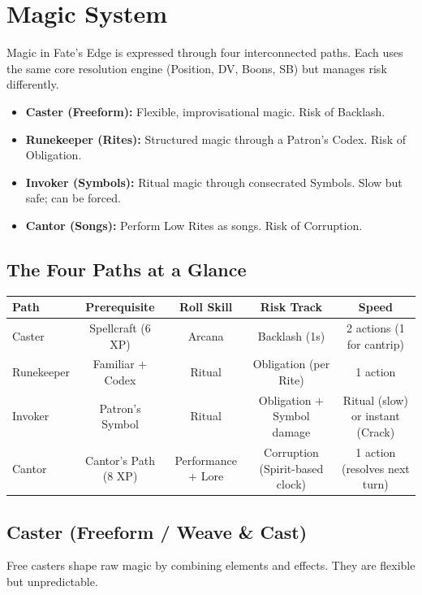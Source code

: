 
\section{Magic System}

Magic in Fate's Edge is expressed through four interconnected paths. Each uses the same core resolution engine (Position, DV, Boons, SB) but manages risk differently.

\begin{itemize}
  \item \textbf{Caster (Freeform):} Flexible, improvisational magic. Risk of Backlash.
  \item \textbf{Runekeeper (Rites):} Structured magic through a Patron's Codex. Risk of Obligation.
  \item \textbf{Invoker (Symbols):} Ritual magic through consecrated Symbols. Slow but safe; can be forced.
  \item \textbf{Cantor (Songs):} Perform Low Rites as songs. Risk of Corruption.
\end{itemize}

\subsection{The Four Paths at a Glance}

\begin{tabular}{@{}lcccc@{}}
\toprule
\textbf{Path} & \textbf{Prerequisite} & \textbf{Roll Skill} & \textbf{Risk Track} & \textbf{Speed} \\
\midrule
Caster & Spellcraft (6 XP) & Arcana & Backlash (1s) & 2 actions (1 for cantrip) \\
Runekeeper & Familiar + Codex & Ritual & Obligation (per Rite) & 1 action \\
Invoker & Patron's Symbol & Ritual & Obligation + Symbol damage & Ritual (slow) or instant (Crack) \\
Cantor & Cantor's Path (8 XP) & Performance + Lore & Corruption (Spirit-based clock) & 1 action (resolves next turn) \\
\bottomrule
\end{tabular}

\subsection{Caster (Freeform / Weave \& Cast)}

Free casters shape raw magic by combining elements and effects. They are flexible but unpredictable.

